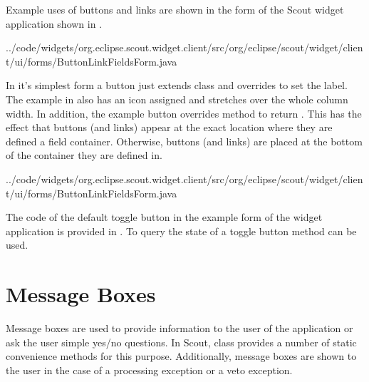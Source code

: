 \documentclass[a4paper,10pt,twoside]{book}
\begin{document}
Example uses of buttons and links are shown in the form  of the Scout widget application shown in . 


{../code/widgets/org.eclipse.scout.widget.client/src/org/eclipse/scout/widget/client/ui/forms/ButtonLinkFieldsForm.java}

In it's simplest form a button just extends class  and overrides  to set the label. 
The example in  also has an icon assigned and stretches over the whole column width. 
In addition, the example button overrides method  to return . 
This has the effect that buttons (and links) appear at the exact location where they are defined a field container. 
Otherwise, buttons (and links) are placed at the bottom of the container they are defined in. 


{../code/widgets/org.eclipse.scout.widget.client/src/org/eclipse/scout/widget/client/ui/forms/ButtonLinkFieldsForm.java}

The code of the default toggle button in the example form of the widget application is provided in . 
To query the state of a toggle button method  can be used. 


\section{Message Boxes}

Message boxes are used to provide information to the user of the application or ask the user simple yes/no questions. 
In Scout, class  provides a number of static convenience methods for this purpose. 
Additionally, message boxes are shown to the user in the case of a processing exception or a veto exception. 
\end{document}
